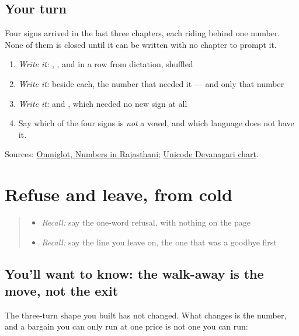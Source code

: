 \subsection*{Your turn}
Four signs arrived in the last three chapters, each riding behind one number. None of them is closed until it can be written with no chapter to prompt it.

\begin{enumerate}
\raggedright
  \item \emph{Write it:} \textbf{}, \textbf{}, \textbf{} and \textbf{} in a row from dictation, shuffled
  \item \emph{Write it:} beside each, the number that needed it — and only that number
  \item \emph{Write it:} \textbf{} and \textbf{ }, which needed no new sign at all
  \item Say which of the four signs is \emph{not} a vowel, and which language does not have it.
\end{enumerate}

\begin{tcolorbox}[breakable,colback=teal!4,colframe=teal!35!black,title={Before you move on}]
Sources: \href{https://www.omniglot.com/language/numbers/rajasthani.htm}{Omniglot, Numbers in Rajasthani}; \href{https://www.unicode.org/charts/PDF/U0900.pdf}{Unicode Devanagari chart}.
\end{tcolorbox}
\section[\texorpdfstring{\mw{कोनी।} — \mw{पाछे} \mw{मिलसू।} (konī. — pāchhe …)}{कोनी। — पाछे मिलसू। (konī. — pāchhe …)}]{Refuse and leave, from cold}

\label{lesson:MW-R39-refusal-second-pass}



\begin{quote}
\begin{itemize}
\raggedright
  \item \emph{Recall:} say the one-word refusal, with nothing on the page
  \item \emph{Recall:} say the line you leave on, the one that was a goodbye first
\end{itemize}
\end{quote}

\subsection*{You'll want to know: the walk-away is the move, not the exit}
The three-turn shape you built has not changed. What changes is the number, and a bargain you can only run at one price is not one you can run:

